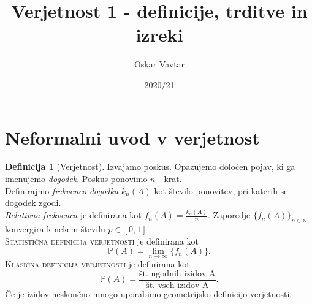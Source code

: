 \documentclass[11pt]{article}
\title{Verjetnost 1 - definicije, trditve in izreki}
\author{Oskar Vavtar}
\date{2020/21}
\theoremstyle{definition}
\newtheorem{definicija}{Definicija}[section]
\begin{document}
\maketitle
\pagebreak
\tableofcontents
\pagebreak

\section{Neformalni uvod v verjetnost}

\begin{definicija}[Verjetnost]

Izvajamo poskus. Opazujemo določen pojav, ki ga imenujemo \textit{dogodek}. Poskus ponovimo $n$ - krat. \\
Definirajmo \textit{frekvenco dogodka} $k_n(A)$ kot število ponovitev, pri katerih se dogodek zgodi. \\
\textit{Relativna frekvenca} je definirana kot $f_n(A) = \frac{k_n(A)}{n}$.
Zaporedje $\{f_n(A)\}_{n \in \mathbb{N}}$ konvergira k nekem številu $p \in [0, 1].$ \\
\textsc{Statistična definicija verjetnosti} je definirana kot
$$\mathbb{P}(A) = \lim_{n\to\infty} \{f_n(A)\}.$$
\textsc{Klasična definicija verjetnosti} je definirana kot
$$\mathbb{P}(A) = \frac{\text{št. ugodnih izidov A}}{\text{št. vseh izidov A}}.$$
Če je izidov neskončno mnogo uporabimo geometrijsko definicijo verjetnosti.

\end{definicija}
\end{document}
